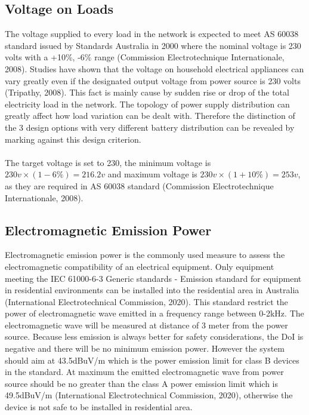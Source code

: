 \documentclass{article}
\begin{document}
\subsection{Voltage on Loads}
The voltage supplied to every load in the network is expected to meet AS 60038 standard issued by Standards Australia in 2000 where the nominal voltage is 230 volts with a +10\%, -6\% range (Commission Electrotechnique Internationale, 2008). Studies have shown that the voltage on household electrical appliances can vary greatly even if the designated output voltage from power source is 230 volts (Tripathy, 2008). This fact is mainly cause by sudden rise or drop of the total electricity load in the network. The topology of power supply distribution can greatly affect how load variation can be dealt with. Therefore the distinction of the 3 design options with very different battery distribution can be revealed by marking against this design criterion.\\
\\
The target voltage is set to 230, the minimum voltage is \(230v\times(1-6\%)=216.2v\) and maximum voltage is \(230v\times(1+10\%)=253v\), as they are required in AS 60038 standard (Commission Electrotechnique Internationale, 2008).
\subsection{Electromagnetic Emission Power}
Electromagnetic emission power is the commonly used measure to assess the electromagnetic compatibility of an electrical equipment. Only equipment meeting the IEC 61000-6-3 Generic standards - Emission standard for equipment in residential environments can be installed into the residential area in Australia (International Electrotechnical Commission, 2020). This standard restrict the power of electromagnetic wave emitted in a frequency range between 0-2kHz. The electromagnetic wave will be measured at distance of 3 meter from the power source. Because less emission is always better for safety considerations, the DoI is negative and there will be no minimum emission power. However the system should aim at 43.5dBuV/m which is the power emission limit for class B devices in the standard. At maximum the emitted electromagnetic wave from power source should be no greater than the class A power emission limit which is 49.5dBuV/m (International Electrotechnical Commission, 2020), otherwise the device is not safe to be installed in residential area.
\end{document}
